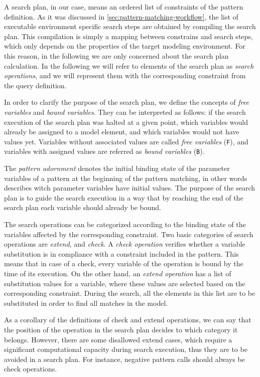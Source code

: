 	 
A search plan, in our case, means an ordered list of constraints of the pattern definition. As it was discussed in \autoref{sec:pattern-matching-workflow}, the list of executable environment specific search steps are obtained by compiling the search plan. This compilation is simply a mapping between constrains and search steps, which only depends on the properties of the target modeling environment. For this reason, in the following we are only concerned about the search plan calculation. In the following we will refer to elements of the search plan as \emph{search operations}, and we will represent them with the corresponding constraint from the query definition.


In order to clarify the purpose of the search plan, we define the concepts of \emph{free variables} and \emph{bound variables}. They can be interpreted as follows: if the search execution of the search plan was halted at a given point, which variables would already be assigned to a model element, and which variables would not have values yet. Variables without associated values are called \emph{free variables} (\texttt{F}), and variables with assigned values are referred as \emph{bound variables} (\texttt{B}). 

The \emph{pattern adornment} denotes the initial binding state of the parameter variables of a pattern at the beginning of the pattern matching, in other words describes witch parameter variables have initial values. The purpose of the search plan is to guide the search execution in a way that by reaching the end of the search plan each variable should already be bound.



The search operations can be categorized according to the binding state of the variables affected by the corresponding constraint. Two basic categories of search operations are \emph{extend}, and \emph{check}. A \emph{check operation} verifies whether a variable substitution is in compliance with a constraint included in the pattern. This means that in case of a check, every variable of the operation is bound by the time of its execution. On the other hand, an \emph{extend operation} has a list of substitution values for a variable, where these values are selected based on the corresponding constraint. During the search, all the elements in this list are to be substituted in order to find all matches in the model.

As a corollary of the definitions of check and extend operations, we can say that the position of the operation in the search plan decides to which category it belongs. However, there are some disallowed extend cases, which require a significant computational capacity during search execution, thus they are to be avoided in a search plan. For instance, negative pattern calls should always be check operations.


